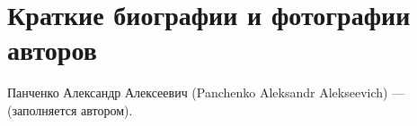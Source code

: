 \documentclass[11pt,a4paper]{article}
\theoremstyle{plain}
\theoremstyle{definition}
\theoremstyle{remark}
\begin{document}
\section*{Краткие биографии и фотографии авторов}

Панченко Александр Алексеевич (Panchenko Aleksandr Alekseevich) ---
(заполняется автором).
\end{document}
